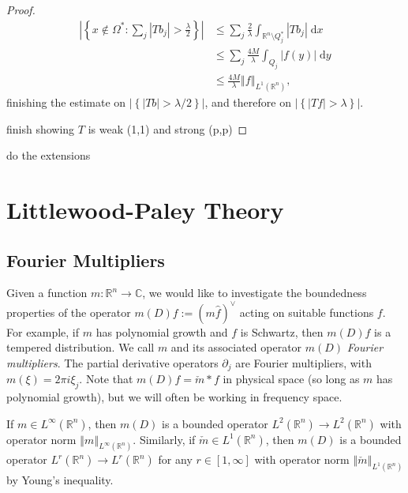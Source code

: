 \documentclass{book}
\newcommand{\bbC}{\mathbb{C}}
\newcommand{\bbR}{\mathbb{R}}
\renewcommand{\d}{\mathrm{d}}
\newcommand{\abs}[1]{\left\lvert {#1} \right\rvert}
\newcommand{\norm}[1]{\left\Vert {#1} \right\Vert}
\newcommand{\set}[1]{\left\{ {#1} \right\}}
\theoremstyle{definition}
\theoremstyle{remark}
\numberwithin{equation}{chapter}
\begin{document}
\begin{proof}
    \begin{equation} \begin{aligned}
        \abs{\set{ x \notin \Omega^* : \sum_j \abs{Tb_j} > \frac{\lambda}{2} }}
        &\leq \sum_j \frac{2}{\lambda} \int_{\bbR^n \setminus Q_j^*} \abs{Tb_j} \; \d{x} \\
        &\leq \sum_j \frac{4M}{\lambda} \int_{Q_j} \abs{f(y)} \; \d{y} \\
        &\leq \frac{4M}{\lambda} \norm{f}_{L^1(\bbR^n)},
    \end{aligned} \end{equation}
    finishing the estimate on $\abs{\set{ \abs{Tb} > \lambda/2 }}$, and therefore on $\abs{\set{ \abs{Tf} > \lambda }}$.

    {\color{red} finish showing $T$ is weak (1,1) and strong (p,p)}
\end{proof}
{\color{red} do the extensions}



\chapter{Littlewood-Paley Theory}

\section{Fourier Multipliers}

Given a function $m \colon \bbR^n \to \bbC$, we would like to investigate the boundedness properties of the operator $m(D)f := (m \widehat{f})^\vee$ acting on suitable functions $f$. For example, if $m$ has polynomial growth and $f$ is Schwartz, then $m(D)f$ is a tempered distribution. We call $m$ and its associated operator $m(D)$ \textit{Fourier multipliers}. The partial derivative operators $\partial_j$ are Fourier multipliers, with $m(\xi) = 2\pi i \xi_j$. Note that $m(D)f = \check{m} \ast f$ in physical space (so long as $m$ has polynomial growth), but we will often be working in frequency space.

If $m \in L^\infty(\bbR^n)$, then $m(D)$ is a bounded operator $L^2(\bbR^n) \to L^2(\bbR^n)$ with operator norm $\norm{m}_{L^\infty(\bbR^n)}$. Similarly, if $\check{m} \in L^1(\bbR^n)$, then $m(D)$ is a bounded operator $L^r(\bbR^n) \to L^r(\bbR^n)$ for any $r \in [1,\infty]$ with operator norm $\norm{\check{m}}_{L^1(\bbR^n)}$ by Young's inequality.
\end{document}
